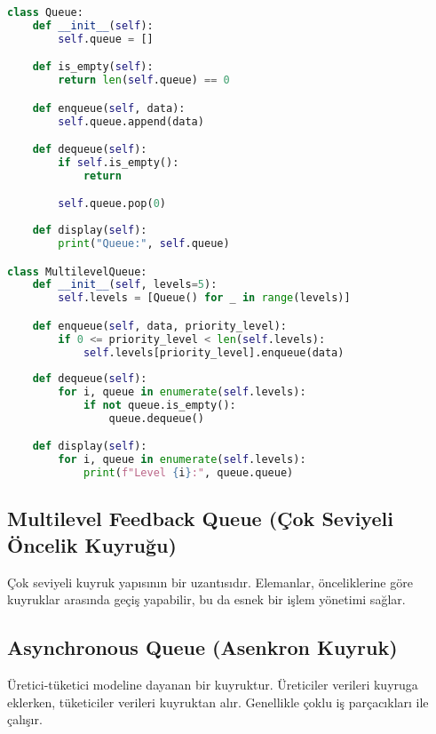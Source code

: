 \begin{lstlisting}[language=Python]
class Queue:
    def __init__(self):
        self.queue = []

    def is_empty(self):
        return len(self.queue) == 0

    def enqueue(self, data):
        self.queue.append(data)

    def dequeue(self):
        if self.is_empty():
            return

        self.queue.pop(0)
        
    def display(self):
        print("Queue:", self.queue)

class MultilevelQueue:
    def __init__(self, levels=5):
        self.levels = [Queue() for _ in range(levels)]

    def enqueue(self, data, priority_level):
        if 0 <= priority_level < len(self.levels):
            self.levels[priority_level].enqueue(data)
    
    def dequeue(self):
        for i, queue in enumerate(self.levels):
            if not queue.is_empty():
                queue.dequeue()

    def display(self):
        for i, queue in enumerate(self.levels):
            print(f"Level {i}:", queue.queue)
\end{lstlisting}

\newpage

\subsection{Multilevel Feedback Queue (Çok Seviyeli Öncelik Kuyruğu)}

Çok seviyeli kuyruk yapısının bir uzantısıdır. Elemanlar, önceliklerine göre kuyruklar arasında geçiş yapabilir, bu da esnek bir işlem yönetimi sağlar.

\newpage

\subsection{Asynchronous Queue (Asenkron Kuyruk)}

Üretici-tüketici modeline dayanan bir kuyruktur. Üreticiler verileri kuyruga eklerken, tüketiciler verileri kuyruktan alır. Genellikle çoklu iş parçacıkları ile çalışır.

\newpage